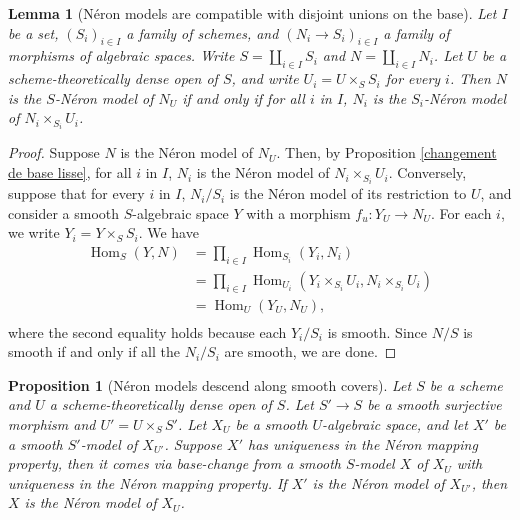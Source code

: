 \documentclass[a4paper,10pt,twoside]{article}
\newcommand{\ra}{\rightarrow}
\DeclareMathOperator{\Hom}{Hom}
\newtheorem{lem}[thm]{Lemma}
\newtheorem{prop}[thm]{Proposition}
\theoremstyle{definition}
\theoremstyle{remark}
\begin{document}
\begin{lem}[N\'eron models are compatible with disjoint unions on the base]\label{lemma:neron_models_compatible_with_disjoint_unions}
Let $I$ be a set, $(S_i)_{i\in I}$ a family of schemes, and $(N_i \to S_i)_{i\in I}$ a family of morphisms of algebraic spaces. Write $S=\coprod\limits_{i\in I}S_i$ and $N=\coprod\limits_{i\in I}N_i$. Let $U$ be a scheme-theoretically dense open of $S$, and write $U_i=U\times_S S_i$ for every $i$. Then $N$ is the $S$-N\'eron model of $N_U$ if and only if for all $i$ in $I$, $N_i$ is the $S_i$-N\'eron model of $N_i\times_{S_i} U_i$.
\end{lem}

\begin{proof}
Suppose $N$ is the N\'eron model of $N_U$. Then, by Proposition \ref{changement de base lisse}, for all $i$ in $I$, $N_i$ is the N\'eron model of $N_i\times_{S_i}U_i$. Conversely, suppose that for every $i$ in $I$, $N_i/S_i$ is the N\'eron model of its restriction to $U$, and consider a smooth $S$-algebraic space $Y$ with a morphism $f_u\colon Y_U \to N_U$. For each $i$, we write $Y_i=Y\times_S S_i$. We have
\begin{align*}
\Hom_S(Y,N) & = \prod\limits_{i\in I} \Hom_{S_i}(Y_i,N_i)\\
& = \prod\limits_{i\in I} \Hom_{U_i}(Y_i\times_{S_i} U_i, N_i\times_{S_i} U_i)\\
& = \Hom_U(Y_U, N_U),\\
\end{align*}
where the second equality holds because each $Y_i/S_i$ is smooth. Since $N/S$ is smooth if and only if all the $N_i/S_i$ are smooth, we are done.
\end{proof}


\begin{prop}[N\'eron models descend along smooth covers]\label{proposition descente lisse du NM}
	Let $S$ be a scheme and $U$ a scheme-theoretically dense open of $S$. Let $S'\ra S$ be a smooth surjective morphism and $U'=U\times_S S'$. Let $X_U$ be a smooth $U$-algebraic space, and let $X'$ be a smooth $S'$-model of $X_{U'}$. Suppose $X'$ has uniqueness in the Néron mapping property, then it comes via base-change from a smooth $S$-model $X$ of $X_U$ with uniqueness in the Néron mapping property. If $X'$ is the Néron model of $X_{U'}$, then $X$ is the Néron model of $X_U$.
\end{prop}
\end{document}
